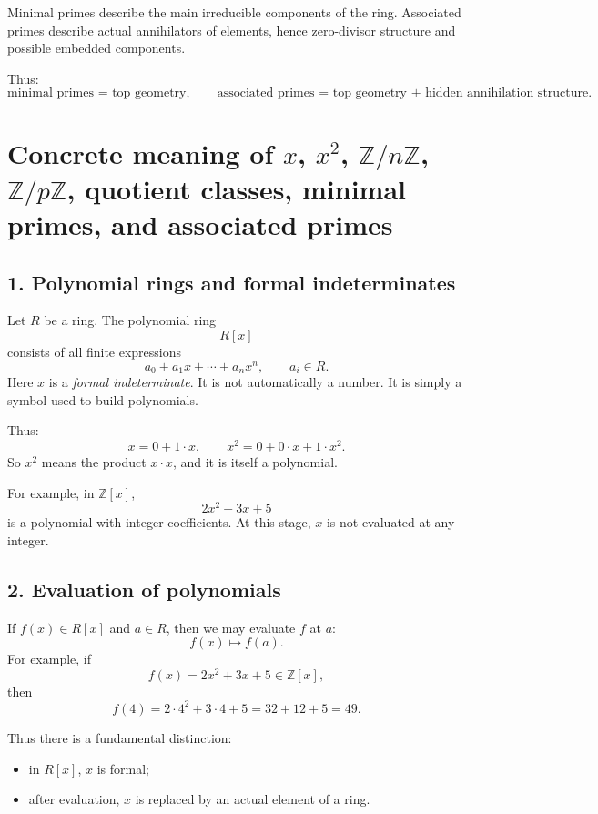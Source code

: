 \documentclass[12pt,a4paper,oneside]{report}
\theoremstyle{notespace}
\begin{document}
	Minimal primes describe the main irreducible components of the ring.
	Associated primes describe actual annihilators of elements, hence zero-divisor structure and possible embedded components.
	
	Thus:
	\[
	\text{minimal primes = top geometry},
	\qquad
	\text{associated primes = top geometry + hidden annihilation structure}.
	\]
	
	\section{Concrete meaning of \(x\), \(x^2\), \(\mathbb Z/n\mathbb Z\), \(\mathbb Z/p\mathbb Z\), quotient classes, minimal primes, and associated primes}
	
	\subsection{1. Polynomial rings and formal indeterminates}
	
	Let \(R\) be a ring. The polynomial ring
	\[
	R[x]
	\]
	consists of all finite expressions
	\[
	a_0+a_1x+\cdots+a_nx^n,
	\qquad a_i\in R.
	\]
	Here \(x\) is a \emph{formal indeterminate}. It is not automatically a number. It is simply a symbol used to build polynomials.
	
	Thus:
	\[
	x=0+1\cdot x,\qquad x^2=0+0\cdot x+1\cdot x^2.
	\]
	So \(x^2\) means the product \(x\cdot x\), and it is itself a polynomial.
	
	For example, in \(\mathbb Z[x]\),
	\[
	2x^2+3x+5
	\]
	is a polynomial with integer coefficients. At this stage, \(x\) is not evaluated at any integer.
	
	\subsection{2. Evaluation of polynomials}
	
	If \(f(x)\in R[x]\) and \(a\in R\), then we may evaluate \(f\) at \(a\):
	\[
	f(x)\mapsto f(a).
	\]
	For example, if
	\[
	f(x)=2x^2+3x+5\in \mathbb Z[x],
	\]
	then
	\[
	f(4)=2\cdot 4^2+3\cdot 4+5=32+12+5=49.
	\]
	
	Thus there is a fundamental distinction:
	\begin{itemize}
		\item in \(R[x]\), \(x\) is formal;
		\item after evaluation, \(x\) is replaced by an actual element of a ring.
	\end{itemize}
	
\end{document}
